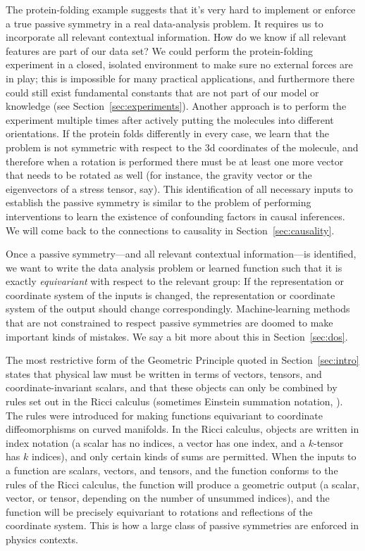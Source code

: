 \documentclass{article}
\theoremstyle{plain}
\theoremstyle{definition}
\theoremstyle{remark}
\newcommand{\sectionname}{Section}
\newcommand{\secref}[1]{\sectionname~\ref{#1}}
\begin{document}
The protein-folding example suggests that it's very hard to implement or enforce a true passive symmetry in a real data-analysis problem.
It requires us to incorporate all relevant contextual information.
How do we know if all relevant features are part of our data set?
We could perform the protein-folding experiment in a closed, isolated environment to make sure no external forces are in play;
this is impossible for many practical applications, and furthermore there could still exist fundamental constants that are not part of our model or knowledge (see \secref{sec:experiments}).
Another approach is to perform the experiment multiple times after actively putting the molecules into different orientations.
If the protein folds differently in every case, we learn that the problem is not symmetric with respect to the 3d coordinates of the molecule, and therefore when a rotation is performed there must be at least one more vector that needs to be rotated as well (for instance, the gravity vector or the eigenvectors of a stress tensor, say).
This identification of all necessary inputs to establish the passive symmetry is similar to the problem of performing interventions to learn the existence of confounding factors in causal inferences.
We will come back to the connections to causality in \secref{sec:causality}.

Once a passive symmetry---and all relevant contextual information---is identified, we want to write the data analysis problem or learned function such that it is exactly \emph{equivariant} with respect to the relevant group:
If the representation or coordinate system of the inputs is changed, the representation or coordinate system of the output should change correspondingly.
Machine-learning methods that are not constrained to respect passive symmetries are doomed to make important kinds of mistakes.
We say a bit more about this in \secref{sec:dos}.

The most restrictive form of the Geometric Principle quoted in \secref{sec:intro} states that physical law must be written in terms of vectors, tensors, and coordinate-invariant scalars, and that these objects can only be combined by rules set out in the Ricci calculus \cite{ricci} (sometimes Einstein summation notation, \citealt{einstein}).
The rules were introduced for making functions equivariant to coordinate diffeomorphisms on curved manifolds.
In the Ricci calculus, objects are written in index notation (a scalar has no indices, a vector has one index, and a $k$-tensor has $k$ indices), and only certain kinds of sums are permitted.
When the inputs to a function are scalars, vectors, and tensors, and the function conforms to the rules of the Ricci calculus, the function will produce a geometric output (a scalar, vector, or tensor, depending on the number of unsummed indices), and the function will be precisely equivariant to rotations and reflections of the coordinate system.
This is how a large class of passive symmetries are enforced in physics contexts.
\end{document}
